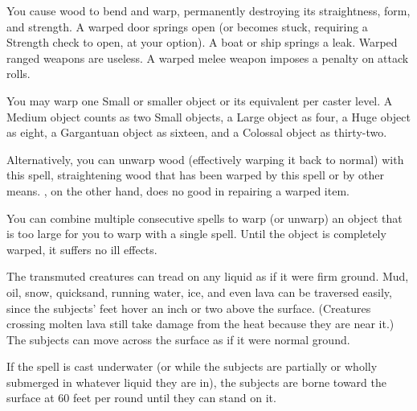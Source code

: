 \spellrng{\rngclose}
\begin{spelleffect}
  You cause wood to bend and warp, permanently destroying its straightness, form, and strength. A warped door springs open (or becomes stuck, requiring a Strength check to open, at your option). A boat or ship springs a leak. Warped ranged weapons are useless. A warped melee weapon imposes a  penalty on attack rolls.
  \par You may warp one Small or smaller object or its equivalent per caster level. A Medium object counts as two Small objects, a Large object as four, a Huge object as eight, a Gargantuan object as sixteen, and a Colossal object as thirty-two.
  \par Alternatively, you can unwarp wood (effectively warping it back to normal) with this spell, straightening wood that has been warped by this spell or by other means. , on the other hand, does no good in repairing a warped item.
\end{spelleffect}
\begin{spellnotes}
  You can combine multiple consecutive  spells to warp (or unwarp) an object that is too large for you to warp with a single spell. Until the object is completely warped, it suffers no ill effects.
\end{spellnotes}

\begin{spelleffect}
  The transmuted creatures can tread on any liquid as if it were firm ground. Mud, oil, snow, quicksand, running water, ice, and even lava can be traversed easily, since the subjects' feet hover an inch or two above the surface. (Creatures crossing molten lava still take damage from the heat because they are near it.) The subjects can move across the surface as if it were normal ground.
  \par If the spell is cast underwater (or while the subjects are partially or wholly submerged in whatever liquid they are in), the subjects are borne toward the surface at 60 feet per round until they can stand on it.
\end{spelleffect}

